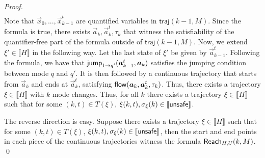 \documentclass[12pt]{llncs}
\newcommand{\traj}{\mathsf{traj}}
\begin{document}
\begin{proof}
\begin{eqnarray*}
\end{eqnarray*}
Note that $\vec x_0,...,\vec x_{k-1}^t$ are quantified variables in $\traj(k-1,M)$. Since the formula is true, there exists $\vec a_{k}, \vec a_k^t, \tau_k$ that witness the satisfiability of the quantifier-free part of the formula outside of $\traj(k-1,M)$. Now, we extend $\xi'\in\llbracket H\rrbracket$ in the following way. Let the last state of $\xi'$ be given by $\vec a^t_{k-1}$. Following the formula, we have that $\jump_{1\rightarrow q'}(\vec a_{k-1}^t, \vec a_k)$ satisfies the jumping condition between mode $q$ and $q'$. It is then followed by a continuous trajectory that starts from $\vec a_k$ and ends at $\vec a_k^t$, satisfying $\flow(\vec a_k, \vec a_k^t, \tau_k)$. Thus, there exists a trajectory $\xi\in \llbracket H\rrbracket$ with $k$ mode changes. Thus, for all $k$ there exists a trajectory $\xi\in \llbracket H\rrbracket$ such that for some $(k,t)\in T(\xi)$, $\xi(k,t),\sigma_{\xi}(k)\in \llbracket \mathsf{unsafe}\rrbracket$.

The reverse direction is easy. Suppose there exists a trajectory $\xi\in \llbracket H\rrbracket$ such that for some $(k,t)\in T(\xi)$, $\xi(k,t),\sigma_{\xi}(k)\in \llbracket \mathsf{unsafe}\rrbracket$, then the start and end points in each piece of the continuous trajectories witness the formula $\mathsf{Reach}_{H,U}(k,M)$.
\qed

\end{proof}
\end{document}
